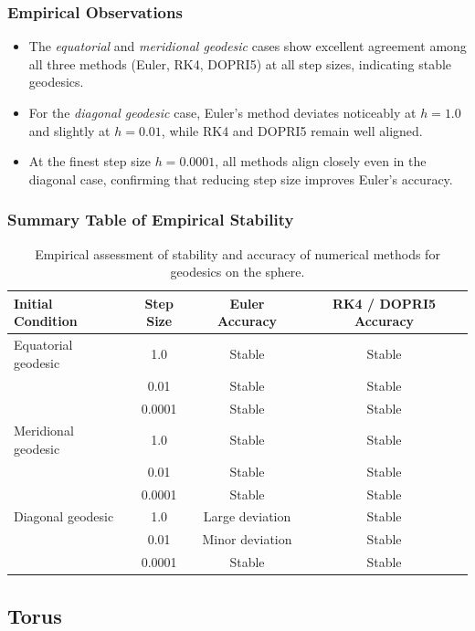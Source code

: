 \documentclass{article}
\begin{document}
	\newpage
		\subsubsection{Empirical Observations}
	
	\begin{itemize}
		\item The \textit{equatorial} and \textit{meridional geodesic} cases show excellent agreement among all three methods (Euler, RK4, DOPRI5) at all step sizes, indicating stable geodesics.
		\item For the \textit{diagonal geodesic} case, Euler's method deviates noticeably at \(h=1.0\) and slightly at \(h=0.01\), while RK4 and DOPRI5 remain well aligned.
		\item At the finest step size \(h=0.0001\), all methods align closely even in the diagonal case, confirming that reducing step size improves Euler's accuracy.
	\end{itemize}
	\subsubsection{Summary Table of Empirical Stability}
	
	\begin{table}[H]
		\centering
		\begin{tabular}{lccc}
			\toprule
			\textbf{Initial Condition} & \textbf{Step Size} & \textbf{Euler Accuracy} & \textbf{RK4 / DOPRI5 Accuracy} \\
			\midrule
			Equatorial geodesic & 1.0 & Stable & Stable \\
			& 0.01 & Stable & Stable \\
			& 0.0001 & Stable & Stable \\
			\midrule
			Meridional geodesic & 1.0 & Stable & Stable \\
			& 0.01 & Stable & Stable \\
			& 0.0001 & Stable & Stable \\
			\midrule
			Diagonal geodesic & 1.0 & Large deviation & Stable \\
			& 0.01 & Minor deviation & Stable \\
			& 0.0001 & Stable & Stable \\
			\bottomrule
		\end{tabular}
		\caption{Empirical assessment of stability and accuracy of numerical methods for geodesics on the sphere.}
	\end{table}
	\newpage
	
	\subsection{Torus}
	
\end{document}
